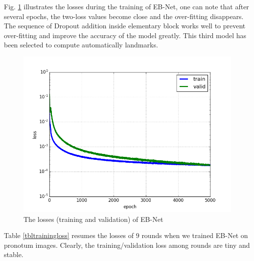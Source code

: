 \documentclass[review]{elsarticle}
\begin{document}
Fig. \ref{figloss3} illustrates the losses during the training of EB-Net, one can note that after several epochs, the two-loss values become close and the over-fitting disappears. The sequence of Dropout addition inside elementary block works well to prevent over-fitting and improve the accuracy of the model greatly. This third model has been selected to compute automatically landmarks.
\begin{figure}[h!]
    \centering
    \includegraphics[scale=0.4]{images/model3_loss}
    \caption{The losses (training and validation) of EB-Net}
    \label{figloss3}
\end{figure}

Table \ref{tbltrainingloss} resumes the losses of $9$ rounds when we trained EB-Net on pronotum images. Clearly, the training/validation loss among rounds are tiny and stable.
\end{document}

